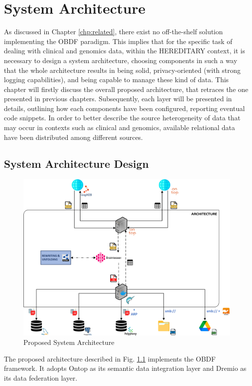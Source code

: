 
\chapter{System Architecture}
\label{chp:architecture}

As discussed in Chapter \ref{chp:related}, there exist no off-the-shelf solution implementing the \ac{OBDF} paradigm. This implies that for the specific task of dealing with clinical and genomics data, within the \ac{HEREDITARY} context, it is necessary to design a system architecture, choosing components in such a way that the whole architecture results in being solid, privacy-oriented (with strong logging capabilities), and being capable to manage these kind of data.
This chapter will firstly discuss the overall proposed architecture, that retraces the one presented in previous chapters. Subsequently, each layer will be presented in details, outlining how each components have been configured, reporting eventual code snippets. In order to better describe the source heterogeneity of data that may occur in contexts such as clinical and genomics, available relational data have been distributed among different sources.

\section{System Architecture Design}
\begin{figure}[ht]
    \centering
    \includegraphics[width=15cm]{res/Drawing1.png}
    \caption{Proposed System Architecture}
    \label{fig:mirco_arch}
\end{figure}
The proposed architecture described in Fig. \ref{fig:mirco_arch} implements the \ac{OBDF} framework. It adopts Ontop as its semantic data integration layer and Dremio as its data federation layer. 


